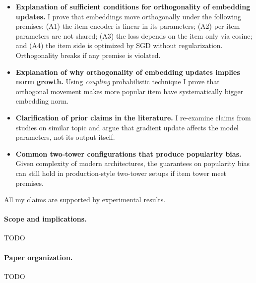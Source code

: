 \begin{itemize}
    \item \textbf{Explanation of sufficient conditions for orthogonality of embedding updates.} I prove that embeddings move orthogonally under the following premises: (A1) the item encoder is linear in its parameters; (A2) per-item parameters are not shared; (A3) the loss depends on the item only via cosine; and (A4) the item side is optimized by SGD without regularization. Orthogonality breaks if any premise is violated.
    \item \textbf{Explanation of why orthogonality of embedding updates implies norm growth.} Using \emph{coupling} probabilistic technique I prove that orthogonal movement makes more popular item have systematically bigger embedding norm.  
    \item \textbf{Clarification of prior claims in the literature.} I re-examine claims from studies on similar topic \cite{wang2017normface,draganov2024pitfalls,draganov2025embeddingnorms} and argue that gradient update affects the model parameters, not its output itself.
    \item \textbf{Common two-tower configurations that produce popularity bias.} Given complexity of modern architectures, the guarantees on popularity bias can still hold in production-style two-tower setups if item tower meet premises.
\end{itemize}

All my claims are supported by experimental results.

\paragraph{Scope and implications.} TODO

\paragraph{Paper organization.} TODO